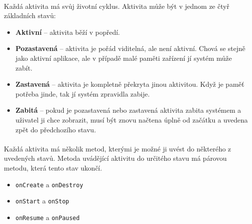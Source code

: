 \paragraph{}
Každá aktivita má svůj životní cyklus. Aktivita může být v jednom ze čtyř základních stavů:
\begin{itemize}
\item \textbf{Aktivní} -- aktivita běží v popředí.
\item \textbf{Pozastavená} -- aktivita je pořád viditelná, ale není aktivní. Chová se stejně jako aktivní aplikace, ale v případě malé paměti zařízení jí systém může zabít.
\item \textbf{Zastavená} -- aktivita je kompletně překryta jinou aktivitou. Když je paměť potřeba jinde, tak jí systém zpravidla zabije.
\item \textbf{Zabitá} -- pokud je pozastavená nebo zastavená aktivita zabita systémem a uživatel ji chce zobrazit, musí být znovu načtena úplně od začátku a uvedena zpět do předchozího stavu.
\end{itemize}
\paragraph{}
Každá aktivita má několik metod, kterými je možné ji uvést do některého z uvedených stavů. Metoda uvádějící aktivitu do určitého stavu má párovou metodu, která tento stav ukončí.
\begin{itemize}
\item \texttt{onCreate} a \texttt{onDestroy}
\item \texttt{onStart} a \texttt{onStop}
\item \texttt{onResume} a \texttt{onPaused}
\end{itemize}